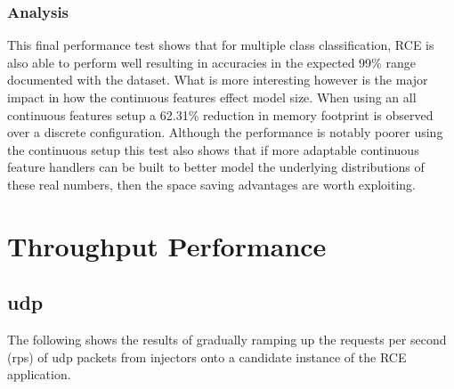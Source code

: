 \documentclass[a4paper,11pt]{scrreprt}
\begin{document}
\subsubsection{Analysis}
This final performance test shows that for multiple class classification, RCE is also able to perform well resulting in accuracies in the expected 99\% range documented with the dataset. What is more interesting however is the major impact in how the continuous features effect model size. When using an all continuous features setup a 62.31\% reduction in memory footprint is observed over a discrete configuration. Although the performance is notably poorer using the continuous setup this test also shows that if more adaptable continuous feature handlers can be built to better model the underlying distributions of these real numbers, then the space saving advantages are worth exploiting. 
\clearpage

\section{Throughput Performance}
\subsection{\acrshort{udp}}
The following shows the results of gradually ramping up the requests per second (\acrshort{rps}) of \acrshort{udp} packets from injectors onto a candidate instance of the RCE application.
\end{document}
